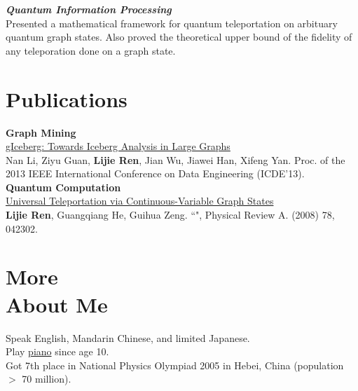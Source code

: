 \documentclass[margin,line]{res}
\begin{document}
\begin{resume}
{\bf{\em Quantum Information Processing}}\\
Presented a mathematical framework for quantum teleportation on arbituary quantum graph states. Also proved the theoretical upper bound of the fidelity of any teleporation done on a graph state.

\section{\sc Publications}
{\bf Graph Mining}\\
\href{https://drive.google.com/open?id=1TMkCJGdvBT6-96O487QWsjsFdTMqDxQT}{gIceberg: Towards Iceberg Analysis in Large Graphs}\\
Nan Li, Ziyu Guan, {\bf{Lijie Ren}}, Jian Wu, Jiawei Han, Xifeng Yan. Proc. of the 2013 IEEE International Conference on Data Engineering (ICDE'13).\\

\vspace*{-.1in}
{\bf Quantum Computation}\\
\href{https://drive.google.com/open?id=16mw5QziHqvVJCKmDTiCaopSsf2f-zJYy}{Universal Teleportation via Continuous-Variable Graph States}\\
{\bf{Lijie Ren}}, Guangqiang He, Guihua Zeng. ``", Physical Review A. (2008) 78, 042302.\\

\vspace{-.1in}

\section{\sc More \\About Me}
Speak English, Mandarin Chinese, and limited Japanese.\\
Play \href{https://soundcloud.com/lijie-ren}{piano} since age 10.\\
Got 7th place in National Physics Olympiad 2005 in Hebei, China (population $>$ 70 million).

\end{resume}
\end{document}
